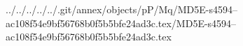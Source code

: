 ../../../../../.git/annex/objects/pP/Mq/MD5E-s4594--ac108f54e9bf56768b0f5b5bfe24ad3c.tex/MD5E-s4594--ac108f54e9bf56768b0f5b5bfe24ad3c.tex